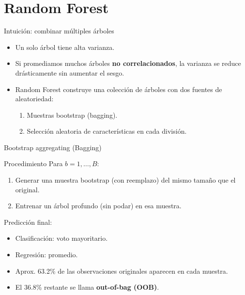\documentclass[aspectratio=169, 10pt, xcolor=table]{beamer}
\begin{document}
\section{Random Forest}

\begin{frame}{Intuición: combinar múltiples árboles}
    \begin{itemize}
        \item Un solo árbol tiene alta varianza.
        \item Si promediamos muchos árboles \textbf{no correlacionados}, la varianza se reduce drásticamente sin aumentar el sesgo.
        \item Random Forest construye una colección de árboles con dos fuentes de aleatoriedad:
        \begin{enumerate}
            \item Muestras bootstrap (bagging).
            \item Selección aleatoria de características en cada división.
        \end{enumerate}
    \end{itemize}
\end{frame}

\begin{frame}{Bootstrap aggregating (Bagging)}
    \begin{block}{Procedimiento}
        Para $b = 1,\dots,B$:
        \begin{enumerate}
            \item Generar una muestra bootstrap (con reemplazo) del mismo tamaño que el original.
            \item Entrenar un árbol profundo (sin podar) en esa muestra.
        \end{enumerate}
        Predicción final:
        \begin{itemize}
            \item Clasificación: voto mayoritario.
            \item Regresión: promedio.
        \end{itemize}
    \end{block}
    \begin{itemize}
        \item Aprox. 63.2\% de las observaciones originales aparecen en cada muestra.
        \item El 36.8\% restante se llama \textbf{out-of-bag (OOB)}.
    \end{itemize}
\end{frame}
\end{document}
